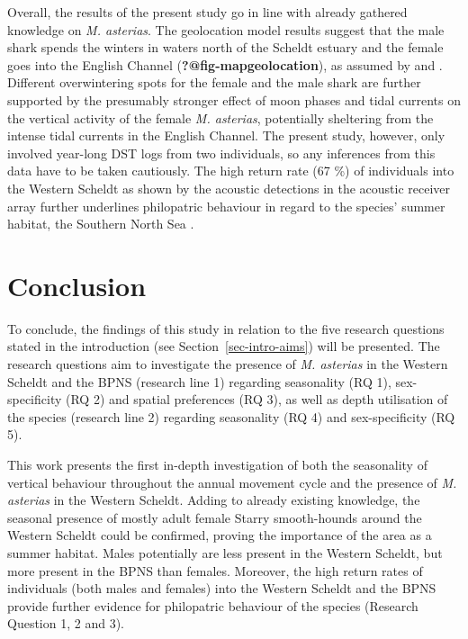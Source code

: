 \documentclass[
  authoryear,
  review,
  3p]{elsarticle}
\begin{document}
Overall, the results of the present study go in line with already
gathered knowledge on \emph{M. asterias}. The geolocation model results
suggest that the male shark spends the winters in waters north of the
Scheldt estuary and the female goes into the English Channel
(\textbf{?@fig-mapgeolocation}), as assumed by \citet{breve_2020} and
\citet{griffiths_2020}. Different overwintering spots for the female and
the male shark are further supported by the presumably stronger effect
of moon phases and tidal currents on the vertical activity of the female
\emph{M. asterias}, potentially sheltering from the intense tidal
currents in the English Channel. The present study, however, only
involved year-long DST logs from two individuals, so any inferences from
this data have to be taken cautiously. The high return rate (67 \%) of
individuals into the Western Scheldt as shown by the acoustic detections
in the acoustic receiver array further underlines philopatric behaviour
in regard to the species' summer habitat, the Southern North Sea
\citep{breve_2016, breve_2020, griffiths_2020}.

\hypertarget{conclusion}{%
\section{Conclusion}\label{conclusion}}

To conclude, the findings of this study in relation to the five research
questions stated in the introduction (see Section~\ref{sec-intro-aims})
will be presented. The research questions aim to investigate the
presence of \emph{M. asterias} in the Western Scheldt and the BPNS
(research line 1) regarding seasonality (RQ 1), sex-specificity (RQ 2)
and spatial preferences (RQ 3), as well as depth utilisation of the
species (research line 2) regarding seasonality (RQ 4) and
sex-specificity (RQ 5).

This work presents the first in-depth investigation of both the
seasonality of vertical behaviour throughout the annual movement cycle
and the presence of \emph{M. asterias} in the Western Scheldt. Adding to
already existing knowledge, the seasonal presence of mostly adult female
Starry smooth-hounds around the Western Scheldt could be confirmed,
proving the importance of the area as a summer habitat. Males
potentially are less present in the Western Scheldt, but more present in
the BPNS than females. Moreover, the high return rates of individuals
(both males and females) into the Western Scheldt and the BPNS provide
further evidence for philopatric behaviour of the species (Research
Question 1, 2 and 3).
\end{document}

